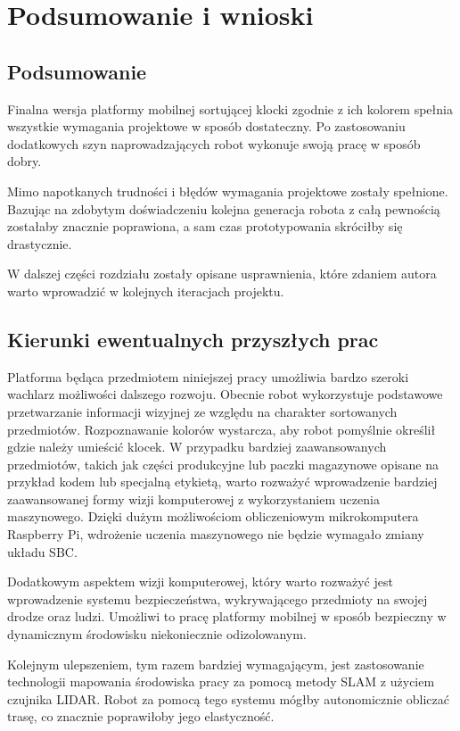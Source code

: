\chapter{Podsumowanie i wnioski}

\section{Podsumowanie}

Finalna wersja platformy mobilnej sortującej klocki zgodnie z ich kolorem spełnia wszystkie wymagania projektowe w sposób dostateczny. Po zastosowaniu dodatkowych szyn naprowadzających robot wykonuje swoją pracę w sposób dobry. 

Mimo napotkanych trudności i błędów wymagania projektowe zostały spełnione. Bazując na zdobytym doświadczeniu kolejna generacja robota z całą pewnością zostałaby znacznie poprawiona, a sam czas prototypowania skróciłby się drastycznie.

W dalszej części rozdziału zostały opisane usprawnienia, które zdaniem autora warto wprowadzić w kolejnych iteracjach projektu. 

\section{Kierunki ewentualnych przyszłych prac}

Platforma będąca przedmiotem niniejszej pracy umożliwia bardzo szeroki wachlarz możliwości dalszego rozwoju. Obecnie robot wykorzystuje podstawowe przetwarzanie informacji wizyjnej ze względu na charakter sortowanych przedmiotów. Rozpoznawanie kolorów wystarcza, aby robot pomyślnie określił gdzie należy umieścić klocek. W przypadku bardziej zaawansowanych przedmiotów, takich jak części produkcyjne lub paczki magazynowe opisane na przykład kodem lub specjalną etykietą, warto rozważyć wprowadzenie bardziej zaawansowanej formy wizji komputerowej z wykorzystaniem uczenia maszynowego. Dzięki dużym możliwościom obliczeniowym mikrokomputera Raspberry Pi, wdrożenie uczenia maszynowego nie będzie wymagało zmiany układu SBC. 

Dodatkowym aspektem wizji komputerowej, który warto rozważyć jest wprowadzenie systemu bezpieczeństwa, wykrywającego przedmioty na swojej drodze oraz ludzi. Umożliwi to pracę platformy mobilnej w sposób bezpieczny w dynamicznym środowisku niekoniecznie odizolowanym. 



Kolejnym ulepszeniem, tym razem bardziej wymagającym, jest zastosowanie technologii mapowania środowiska pracy za pomocą metody SLAM z użyciem czujnika LIDAR. Robot za pomocą tego systemu mógłby autonomicznie obliczać trasę, co znacznie poprawiłoby jego elastyczność. 




